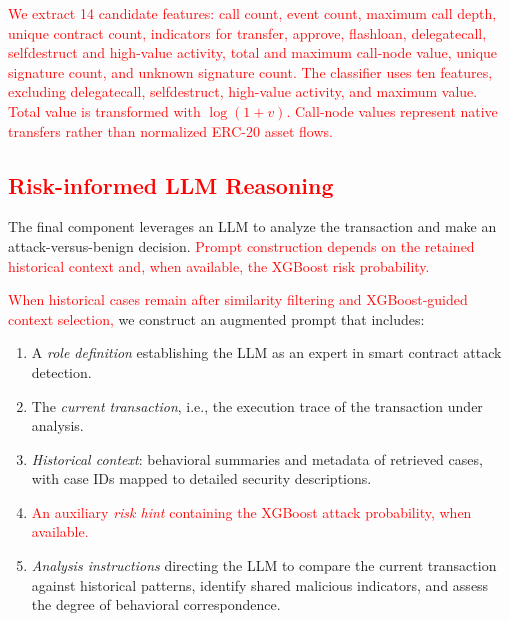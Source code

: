\textcolor{red}{We extract 14 candidate features: call count, event count, maximum call depth, unique contract count, indicators for transfer, approve, flashloan, delegatecall, selfdestruct and high-value activity, total and maximum call-node value, unique signature count, and unknown signature count. The classifier uses ten features, excluding delegatecall, selfdestruct, high-value activity, and maximum value. Total value is transformed with $\log(1+v)$. Call-node values represent native transfers rather than normalized ERC-20 asset flows.}

\subsection{\textcolor{red}{Risk-informed LLM Reasoning}}

\label{sec:reasoning}

The final component leverages an LLM to analyze the transaction and make an attack-versus-benign decision. \textcolor{red}{Prompt construction depends on the retained historical context and, when available, the XGBoost risk probability.}


\textcolor{red}{When historical cases remain after similarity filtering and XGBoost-guided context selection,} we construct an augmented prompt that includes:

\begin{enumerate}
    \item A \textit{role definition} establishing the LLM as an expert in smart contract attack detection.
    \item The \textit{current transaction}, i.e., the execution trace of the transaction under analysis.
    \item \textit{Historical context}: behavioral summaries and metadata of retrieved cases, with case IDs mapped to detailed security descriptions.
    \item \textcolor{red}{An auxiliary \textit{risk hint} containing the XGBoost attack probability, when available.}
    \item \textit{Analysis instructions} directing the LLM to compare the current transaction against historical patterns, identify shared malicious indicators, and assess the degree of behavioral correspondence.
\end{enumerate}

